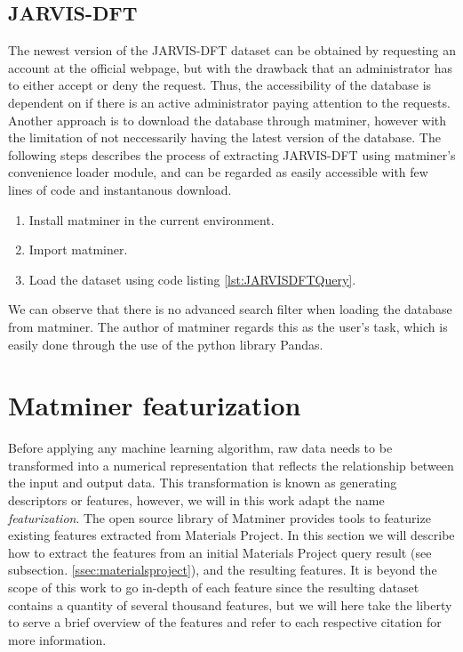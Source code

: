 \subsection{JARVIS-DFT}

The newest version of the JARVIS-DFT dataset can be obtained by requesting an account at the official webpage, but with the drawback that an administrator has to either accept or deny the request. Thus, the accessibility of the database is dependent on if there is an active administrator paying attention to the requests. Another approach is to download the database through matminer, however with the limitation of not neccessarily having the latest version of the database. The following steps describes the process of extracting JARVIS-DFT using matminer's convenience loader module, and can be regarded as easily accessible with few lines of code and instantanous download.

\begin{enumerate}
  \item Install matminer in the current environment.
  \item Import matminer.
  \item Load the dataset using code listing \ref{lst:JARVISDFTQuery}.
\end{enumerate}


We can observe that there is no advanced search filter when loading the database from matminer. The author of matminer regards this as the user's task, which is easily done through the use of the python library Pandas.

\section{Matminer featurization}

Before applying any machine learning algorithm, raw data needs to be transformed into a numerical representation that reflects the relationship between the input and output data. This transformation is known as generating descriptors or features, however, we will in this work adapt the name \textit{featurization}. The open source library of Matminer provides tools to featurize existing features extracted from Materials Project. In this section we will describe how to extract the features from an initial Materials Project query result (see subsection. \ref{ssec:materialsproject}), and the resulting features. It is beyond the scope of this work to go in-depth of each feature since the resulting dataset contains a quantity of several thousand features, but we will here take the liberty to serve a brief overview of the features and refer to each respective citation for more information.

